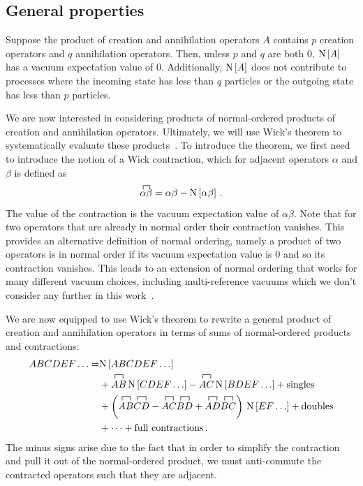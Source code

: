 \subsection{General properties}\label{sec:normal_ordering_properties}

Suppose the product of creation and annihilation operators $A$
contains $p$ creation operators and $q$ annihilation operators.
Then, unless $p$ and $q$ are both 0,
$\text{N}\left[A\right]$ has a vacuum expectation value of 0.
Additionally, $\text{N}\left[A\right]$ does not contribute to processes
where the incoming state has less than $q$ particles
or the outgoing state has less than $p$ particles.

We are now interested in considering products of normal-ordered products
of creation and annihilation operators.
Ultimately, we will use Wick's theorem to systematically evaluate these products~\cite{Wick50wickthm}.
To introduce the theorem, we first need to introduce the notion of a Wick contraction,
which for adjacent operators $\alpha$ and $\beta$ is defined as
\begin{equation}
  \acontraction{}{\alpha}{}{\beta}
  \alpha \beta = \alpha \beta - \nogen{\alpha \beta}\,.
\end{equation}
The value of the contraction is the vacuum expectation value of $\alpha \beta$.
Note that for two operators that are already in normal order their contraction vanishes.
This provides an alternative definition of normal ordering,
namely a product of two operators is in normal order
if its vacuum expectation value is 0
and so its contraction vanishes.
This leads to an extension of normal ordering
that works for many different vacuum choices,
including multi-reference vacuums
which we don't consider any further in this work~\cite{Kutz97mrno}.

We are now equipped to use Wick's theorem
to rewrite a general product of creation and annihilation operators
in terms of sums of normal-ordered products and contractions:
\begin{equation}\label{eq:wicks_theorem}
  \begin{split}
    ABCDEF\ldots =& \nogen{ABCDEF\ldots} \\
    & + \acontraction{}{A}{}{B} AB \,\nogen{CDEF\ldots} - \acontraction{}{A}{}{C} AC \,\nogen{BDEF\ldots} + \text{singles}\\
    &+ \left(\acontraction{}{A}{}{B} AB \acontraction{}{C}{}{D} CD
    - \acontraction{}{A}{}{C} AC \acontraction{}{B}{}{D} BD
    + \acontraction{}{A}{}{D} AD \acontraction{}{B}{}{C} BC\right) \, \nogen{EF\ldots} + \text{doubles} \\
    &+ \cdots + \text{full contractions}\,.
  \end{split}
\end{equation}
The minus signs arise due to the fact that in order to simplify the contraction
and pull it out of the normal-ordered product,
we must anti-commute the contracted operators such that they are adjacent.

